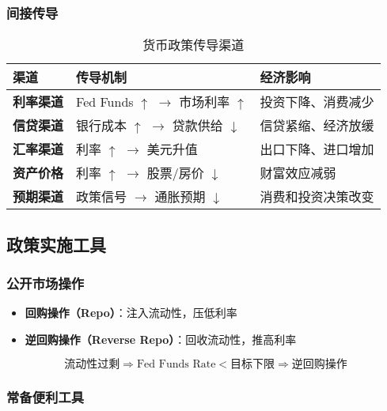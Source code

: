 \subsubsection{间接传导}

\begin{table}[H]
\centering
\caption{货币政策传导渠道}
\begin{tabular}{|l|p{6cm}|p{5cm}|}
\hline
\textbf{渠道} & \textbf{传导机制} & \textbf{经济影响} \\
\hline
\textbf{利率渠道} & Fed Funds $\uparrow$ $\rightarrow$ 市场利率 $\uparrow$ & 投资下降、消费减少 \\
\hline
\textbf{信贷渠道} & 银行成本 $\uparrow$ $\rightarrow$ 贷款供给 $\downarrow$ & 信贷紧缩、经济放缓 \\
\hline
\textbf{汇率渠道} & 利率 $\uparrow$ $\rightarrow$ 美元升值 & 出口下降、进口增加 \\
\hline
\textbf{资产价格} & 利率 $\uparrow$ $\rightarrow$ 股票/房价 $\downarrow$ & 财富效应减弱 \\
\hline
\textbf{预期渠道} & 政策信号 $\rightarrow$ 通胀预期 $\downarrow$ & 消费和投资决策改变 \\
\hline
\end{tabular}
\end{table}

\subsection{政策实施工具}

\subsubsection{公开市场操作}

\begin{itemize}
    \item \textbf{回购操作（Repo）}：注入流动性，压低利率
    \item \textbf{逆回购操作（Reverse Repo）}：回收流动性，推高利率
\end{itemize}

\begin{equation}
\text{流动性过剩} \Rightarrow \text{Fed Funds Rate} < \text{目标下限} \Rightarrow \text{逆回购操作}
\end{equation}

\subsubsection{常备便利工具}

